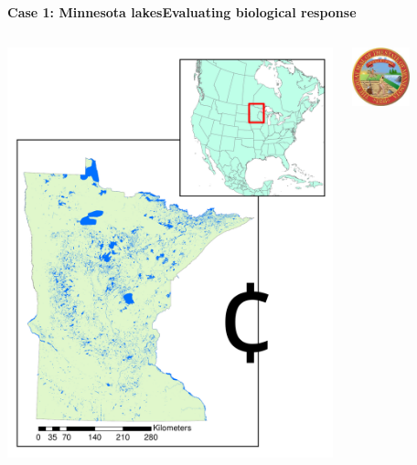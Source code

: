 \documentclass[serif]{beamer}\usepackage[]{graphicx}\usepackage[]{color}
\begin{document}
\begin{frame}{\textbf{Case 1: Minnesota lakes}}{\textbf{Evaluating biological response}}
\begin{columns}
\begin{column}{0.5\textwidth}
\centerline{\includegraphics[width=\textwidth]{fig/mn_lake_inset.pdf}}
\end{column}
\begin{column}{0.5\textwidth}
\begin{center}
\includegraphics[width=0.5\textwidth]{fig/mn_seal.jpg} \\~\\

\end{center}
\end{column}
\end{columns}
\end{frame}
\end{document}
